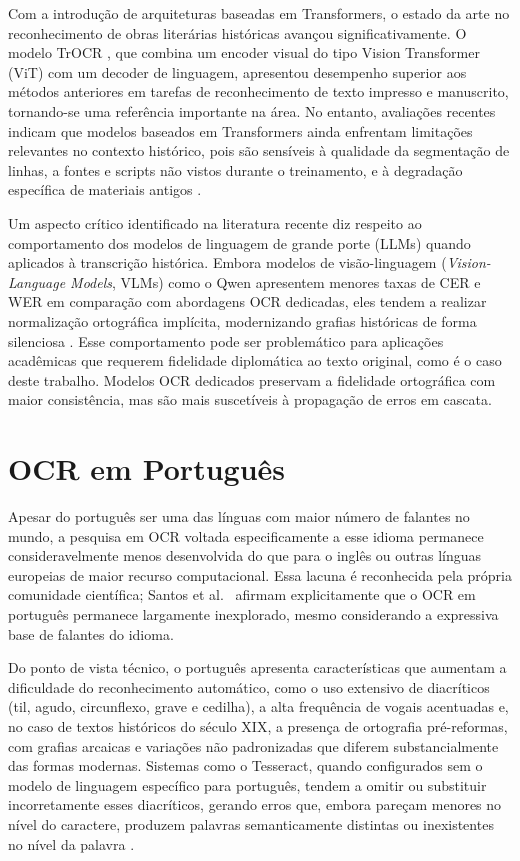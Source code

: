 \documentclass[
  12pt,
  oneside,
  a4paper,
  chapter=TITLE,
  section=TITLE,
  english,
  brazil
]{abntex2}
\begin{document}
Com a introdução de arquiteturas baseadas em Transformers, o estado da arte no
reconhecimento de obras literárias históricas avançou significativamente. O modelo
TrOCR \cite{huang2021}, que combina um encoder visual do tipo Vision Transformer (ViT)
com um decoder de linguagem, apresentou desempenho superior aos métodos anteriores em
tarefas de reconhecimento de texto impresso e manuscrito, tornando-se uma referência
importante na área. No entanto, avaliações recentes indicam que modelos baseados em
Transformers ainda enfrentam limitações relevantes no contexto histórico, pois são
sensíveis à qualidade da segmentação de linhas, a fontes e scripts não vistos durante o
treinamento, e à degradação específica de materiais antigos \cite{vesalainen2025}.

Um aspecto crítico identificado na literatura recente diz respeito ao comportamento dos
modelos de linguagem de grande porte (LLMs) quando aplicados à transcrição histórica.
Embora modelos de visão-linguagem (\textit{Vision-Language Models}, VLMs) como o Qwen
apresentem menores taxas de CER e WER em comparação com abordagens OCR dedicadas, eles
tendem a realizar normalização ortográfica implícita, modernizando grafias históricas de
forma silenciosa \cite{vesalainen2025}. Esse comportamento pode ser problemático para
aplicações acadêmicas que requerem fidelidade diplomática ao texto original, como é o
caso deste trabalho. Modelos OCR dedicados preservam a fidelidade ortográfica com maior
consistência, mas são mais suscetíveis à propagação de erros em cascata.

\section{OCR em Português}
\label{sec:ocr_portugues}

Apesar do português ser uma das línguas com maior número de falantes no mundo, a
pesquisa em OCR voltada especificamente a esse idioma permanece consideravelmente menos
desenvolvida do que para o inglês ou outras línguas europeias de maior recurso
computacional. Essa lacuna é reconhecida pela própria comunidade científica; Santos
et al.\ \cite{santos2023} afirmam explicitamente que o OCR em português permanece
largamente inexplorado, mesmo considerando a expressiva base de falantes do idioma.

Do ponto de vista técnico, o português apresenta características que aumentam a
dificuldade do reconhecimento automático, como o uso extensivo de diacríticos (til,
agudo, circunflexo, grave e cedilha), a alta frequência de vogais acentuadas e, no caso
de textos históricos do século XIX, a presença de ortografia pré-reformas, com grafias
arcaicas e variações não padronizadas que diferem substancialmente das formas modernas.
Sistemas como o Tesseract, quando configurados sem o modelo de linguagem específico para
português, tendem a omitir ou substituir incorretamente esses diacríticos, gerando erros
que, embora pareçam menores no nível do caractere, produzem palavras semanticamente
distintas ou inexistentes no nível da palavra \cite{smith2019}.
\end{document}
